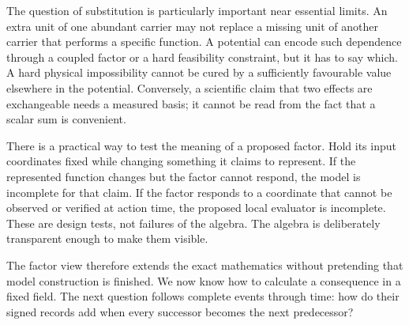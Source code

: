 The question of substitution is particularly important near essential limits. An extra unit of one abundant carrier may not replace a missing unit of another carrier that performs a specific function. A potential can encode such dependence through a coupled factor or a hard feasibility constraint, but it has to say which. A hard physical impossibility cannot be cured by a sufficiently favourable value elsewhere in the potential. Conversely, a scientific claim that two effects are exchangeable needs a measured basis; it cannot be read from the fact that a scalar sum is convenient.

There is a practical way to test the meaning of a proposed factor. Hold its input coordinates fixed while changing something it claims to represent. If the represented function changes but the factor cannot respond, the model is incomplete for that claim. If the factor responds to a coordinate that cannot be observed or verified at action time, the proposed local evaluator is incomplete. These are design tests, not failures of the algebra. The algebra is deliberately transparent enough to make them visible.

The factor view therefore extends the exact mathematics without pretending that model construction is finished. We now know how to calculate a consequence in a fixed field. The next question follows complete events through time: how do their signed records add when every successor becomes the next predecessor?
